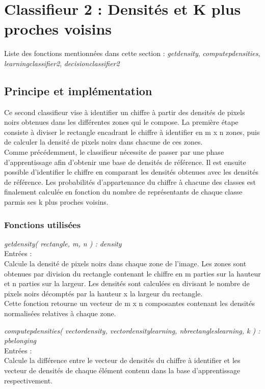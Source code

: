 \section{Classifieur 2 : Densités et K plus proches voisins}
Liste des fonctions mentionnées dans cette section : \textit{getdensity}, \textit{computepdensities}, \textit{learningclassifier2}, \textit{decisionclassifier2}

\subsection{Principe et implémentation}

Ce second classifieur vise à identifier un chiffre à partir des densités de pixels noirs obtenues dans les différentes zones qui le compose. La première étape consiste à diviser le rectangle encadrant le chiffre à identifier en m x n zones, puis de calculer la densité de pixels noirs dans chacune de ces zones.\\

Comme précédemment, le classifieur nécessite de passer par une phase d'apprentissage afin d'obtenir une base de densités de référence. Il est ensuite possible d'identifier le chiffre en comparant les densités obtenues avec les densités de référence. Les probabilités d'appartenance du chiffre à chacune des classes est finalement calculée en fonction du nombre de représentants de chaque classe parmis ses k plus proches voisins.

\subsubsection{Fonctions utilisées}

\textit{getdensity( rectangle, m, n ) : density}\\
Entrées :\\
Calcule la densité de pixels noirs dans chaque zone de l'image. Les zones sont obtenues par division du rectangle contenant le chiffre en m parties sur la hauteur et n parties sur la largeur. Les densités sont calculées en divisant le nombre de pixels noirs décomptés par la hauteur x la largeur du rectangle.\\
Cette fonction retourne un vecteur de m x n composantes contenant les densités normalisées relatives à chaque zone.

\textit{computepdensities( vectordensity, vectordensitylearning, nbrectangleslearning, k ) : pbelonging}\\
Entrées :\\
Calcule la différence entre le vecteur de densités du chiffre à identifier et les vecteur de densités de chaque élément contenu dans la base d'apprentissage respectivement.



